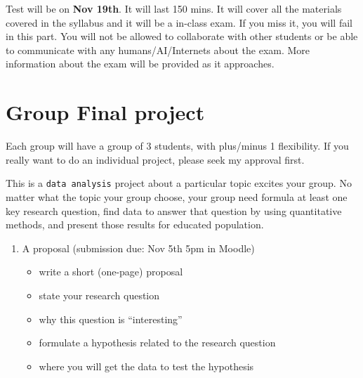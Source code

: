 \documentclass[
  letterpaper,
  DIV=11,
  numbers=noendperiod]{scrartcl}
\providecommand{\tightlist}{%
  \setlength{\itemsep}{0pt}\setlength{\parskip}{0pt}}
\begin{document}
Test will be on \textbf{Nov 19th}. It will last 150 mins. It will cover
all the materials covered in the syllabus and it will be a in-class
exam. If you miss it, you will fail in this part. You will not be
allowed to collaborate with other students or be able to communicate
with any humans/AI/Internets about the exam. More information about the
exam will be provided as it approaches.

\section{Group Final project}\label{group-final-project}

Each group will have a group of 3 students, with plus/minus 1
flexibility. If you really want to do an individual project, please seek
my approval first.

This is a \texttt{data\ analysis} project about a particular topic
excites your group. No matter what the topic your group choose, your
group need formula at least one key research question, find data to
answer that question by using quantitative methods, and present those
results for educated population.

\begin{enumerate}
\def\labelenumi{\arabic{enumi}.}
\tightlist
\item
  A proposal (submission due: Nov 5th 5pm in Moodle)

  \begin{itemize}
  \tightlist
  \item
    write a short (one-page) proposal
  \item
    state your research question
  \item
    why this question is ``interesting''
  \item
    formulate a hypothesis related to the research question
  \item
    where you will get the data to test the hypothesis
  \end{itemize}
\end{enumerate}
\end{document}
